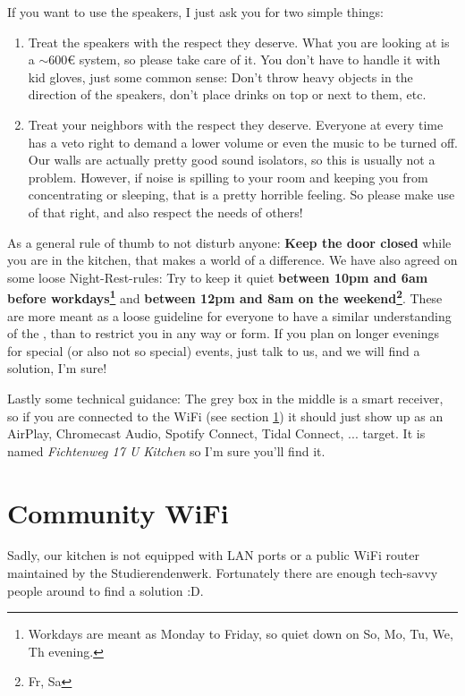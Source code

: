 If you want to use the speakers, I just ask you for two simple things:
\begin{enumerate}
    \item Treat the speakers with the respect they deserve. What you are looking at is a $\sim$600€ system, so please take care of it. You don't have to handle it with kid gloves, just some common sense: Don't throw heavy objects in the direction of the speakers, don't place drinks on top or next to them, etc.
    \item Treat your neighbors with the respect they deserve. Everyone at every time has a veto right to demand a lower volume or even the music to be turned off. Our walls are actually pretty good sound isolators, so this is usually not a problem. However, if noise is spilling to your room and keeping you from concentrating or sleeping, that is a pretty horrible feeling. So please make use of that right, and also respect the needs of others!
\end{enumerate}

As a general rule of thumb to not disturb anyone: \textbf{Keep the door closed} while you are in the kitchen, that makes a world of a difference. We have also agreed on some loose Night-Rest-rules: Try to keep it quiet \textbf{between 10pm and 6am before workdays\footnote{Workdays are meant as Monday to Friday, so quiet down on So, Mo, Tu, We, Th evening.}} and \textbf{between 12pm and 8am on the weekend\footnote{Fr, Sa}}. These  are more meant as a loose guideline for everyone to have a similar understanding of the , than to restrict you in any way or form. If you plan on longer evenings for special (or also not so special) events, just talk to us, and we will find a solution, I'm sure!

Lastly some technical guidance: The grey box in the middle is a smart receiver, so if you are connected to the WiFi (see section \ref{sec:wifi}) it should just show up as an AirPlay, Chromecast Audio, Spotify Connect, Tidal Connect, ... target. It is named \textit{Fichtenweg 17 U Kitchen} so I'm sure you'll find it.

\section{Community WiFi} \label{sec:wifi}
Sadly, our kitchen is not equipped with LAN ports or a public WiFi router maintained by the Studierendenwerk. Fortunately there are enough tech-savvy people around to find a solution :D.

